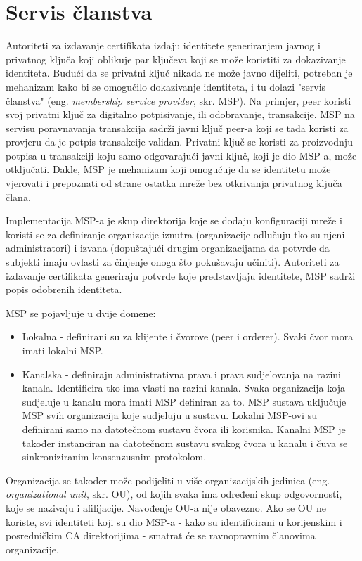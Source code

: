 \documentclass[times, utf8, diplomski]{fer}
\begin{document}
\section{Servis članstva}
Autoriteti za izdavanje certifikata izdaju identitete generiranjem javnog i privatnog ključa koji oblikuje par ključeva koji se može koristiti za dokazivanje identiteta. Budući da se privatni ključ nikada ne može javno dijeliti, potreban je mehanizam kako bi se omogućilo dokazivanje identiteta,  i tu dolazi "servis članstva" (eng.  \textit{membership service provider}, skr. MSP). Na primjer, peer koristi svoj privatni ključ za digitalno potpisivanje, ili odobravanje,  transakcije. MSP na servisu poravnavanja transakcija sadrži javni ključ peer-a koji se tada koristi za provjeru da je potpis transakcije validan. Privatni ključ se koristi za proizvodnju potpisa u transakciji koju samo odgovarajući javni ključ, koji je dio MSP-a,  može otključati.  Dakle, MSP je mehanizam koji omogućuje da se identitetu može vjerovati i prepoznati od strane ostatka mreže bez otkrivanja privatnog ključa člana. \cite{Fabric}

Implementacija MSP-a je skup direktorija koje se dodaju konfiguraciji mreže i koristi se za definiranje organizacije iznutra (organizacije odlučuju tko su njeni administratori) i izvana (dopuštajući drugim organizacijama da potvrde da subjekti imaju ovlasti za činjenje onoga što pokušavaju učiniti). Autoriteti za izdavanje certifikata generiraju potvrde koje predstavljaju identitete,  MSP sadrži popis odobrenih identiteta.

MSP se pojavljuje u dvije domene:
\begin{itemize}
\item Lokalna - definirani su za klijente i čvorove (peer i orderer). Svaki čvor mora imati lokalni MSP.
\item Kanalska - definiraju administrativna prava i prava sudjelovanja na razini kanala.  Identificira tko ima vlasti na razini kanala.  Svaka organizacija koja sudjeluje u kanalu mora imati MSP definiran za to.  MSP sustava uključuje MSP svih organizacija koje sudjeluju u sustavu.  Lokalni MSP-ovi su definirani samo na datotečnom sustavu čvora ili korisnika.  Kanalni MSP je također instanciran na datotečnom sustavu svakog čvora u kanalu i čuva se sinkroniziranim konsenzusnim protokolom.
\end{itemize}

Organizacija se također može podijeliti u više organizacijskih jedinica (eng. \textit{organizational unit}, skr. OU), od kojih svaka ima određeni skup odgovornosti, koje se nazivaju i afilijacije.   Navođenje OU-a nije obavezno. Ako se OU ne koriste, svi identiteti koji su dio MSP-a - kako su identificirani u korijenskim i posredničkim CA direktorijima - smatrat će se ravnopravnim članovima organizacije.
\end{document}
